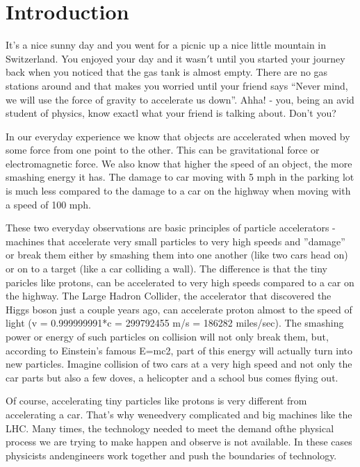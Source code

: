 \section{Introduction}

\noindent
It's  a nice sunny day and you went for a picnic up a nice little mountain in Switzerland. You enjoyed your day and it wasn$'$t until you started your journey back when you noticed that the gas tank is almost empty. There are no gas stations around and that makes you worried until your friend says ``Never mind, we will use the force of gravity to accelerate us down''. Ahha! - you, being an avid student of physics, know exactl what your friend is talking about. Don't you?

\;
\noindent
In our everyday experience we know that objects are accelerated when moved by some force from one point to the other. This can be gravitational force or electromagnetic force.
We also know that higher the speed of an object, the more smashing energy it has. The damage to car moving with 5 mph in the parking lot is much less compared to the damage to a car on the highway when moving with a speed of 100 mph.

\;
\noindent
These two everyday observations are basic principles of particle accelerators - machines that accelerate very small particles to very high speeds and ''damage'' or break them either by smashing them into one another (like two cars head on) or on to a target (like a car colliding a wall). The difference is that the tiny paricles like protons, can be accelerated to very high speeds compared to a car on the highway. The Large Hadron Collider, the accelerator that discovered the Higgs boson just a couple years ago, can accelerate proton almost to the speed of light (v = 0.999999991*c = 299792455 m/s = 186282 miles/sec). The smashing power or energy of such particles on collision will not only break them, but, according to Einstein's famous E=mc2, part of this energy will actually turn into new particles. Imagine collision of two cars at a very high speed and not only the car parts but also a few doves, a helicopter and a school bus comes flying out.

\;
\noindent
Of course, accelerating tiny particles like protons is very different from accelerating a car. That's why weneedvery complicated and big machines like the LHC. Many times, the technology needed to meet the demand ofthe physical process we are trying to make happen and observe is not available. In these cases physicists andengineers work together and push the boundaries of technology.

